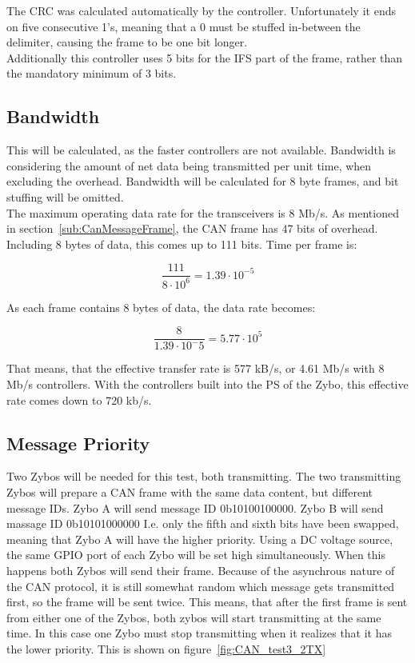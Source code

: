 The CRC was calculated automatically by the controller.
Unfortunately it ends on five consecutive 1's, meaning that a 0 must be stuffed in-between the delimiter, causing the frame to be one bit longer.\\

Additionally this controller uses 5 bits for the IFS part of the frame, rather than the mandatory minimum of 3 bits. 



\subsection{Bandwidth}\label{sub:CAN_bandwidth}
This will be calculated, as the faster controllers are not available.
Bandwidth is considering the amount of net data being transmitted per unit time, when excluding the overhead.
Bandwidth will be calculated for 8 byte frames, and bit stuffing will be omitted.\\

The maximum operating data rate for the transceivers is 8 Mb/s.
As mentioned in section~\ref{sub:CanMessageFrame}, the CAN frame has 47 bits of overhead. 
Including 8 bytes of data, this comes up to 111 bits. 
Time per frame is:

\begin{equation}
\frac{111}{8 \cdot 10^6} = 1.39 \cdot 10^{-5}
\end{equation}

As each frame contains 8 bytes of data, the data rate becomes:

\begin{equation}
\frac{8}{1.39 \cdot 10^-5}= 5.77 \cdot 10^5
\end{equation}

That means, that the effective transfer rate is 577 kB/s, or 4.61 Mb/s with 8 Mb/s controllers. 
With the controllers built into the PS of the Zybo, this effective rate comes down to 720 kb/s.

\subsection{Message Priority}\label{sub:CAN_message priority}

Two Zybos will be needed for this test, both transmitting.
The two transmitting Zybos will prepare a CAN frame with the same data content, but different message IDs.
Zybo A will send message ID 0b10100100000.
Zybo B will send massage ID 0b10101000000
I.e. only the fifth and sixth bits have been swapped, meaning that Zybo A will have the higher priority.
Using a DC voltage source, the same GPIO port of each Zybo will be set high simultaneously.
When this happens both Zybos will send their frame.
Because of the asynchrous nature of the CAN protocol, it is still somewhat random which message gets transmitted first, so the frame will be sent twice. 
This means, that after the first frame is sent from either one of the Zybos, both zybos will start transmitting at the same time. 
In this case one Zybo must stop transmitting when it realizes that it has the lower priority.
This is shown on figure~\ref{fig:CAN_test3_2TX}

